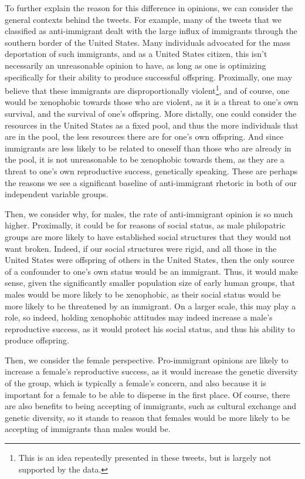 \documentclass{article}
\begin{document}
To further explain the reason for this difference in opinions, we can consider the general contexts behind the tweets. For example, many of the tweets that we classified as anti-immigrant dealt with the large influx of immigrants through the southern border of the United States. Many individuals advocated for the mass deportation of such immigrants, and as a United States citizen, this isn't necessarily an unreasonable opinion to have, as long as one is optimizing specifically for their ability to produce successful offspring. Proximally, one may believe that these immigrants are disproportionally violent\footnote{This is an idea repeatedly presented in these tweets, but is largely not supported by the data.}, and of course, one would be xenophobic towards those who are violent, as it is a threat to one's own survival, and the survival of one's offspring. More distally, one could consider the resources in the United States as a fixed pool, and thus the more individuals that are in the pool, the less resources there are for one's own offspring. And since immigrants are less likely to be related to oneself than those who are already in the pool, it is not unreasonable to be xenophobic towards them, as they are a threat to one's own reproductive success, genetically speaking. These are perhaps the reasons we see a significant baseline of anti-immigrant rhetoric in both of our independent variable groups. 

Then, we consider why, for males, the rate of anti-immigrant opinion is so much higher. Proximally, it could be for reasons of social status, as male philopatric groups are more likely to have established social structures that they would not want broken. Indeed, if our social structures were rigid, and all those in the United States were offspring of others in the United States, then the only source of a confounder to one's own status would be an immigrant. Thus, it would make sense, given the significantly smaller population size of early human groups, that males would be more likely to be xenophobic, as their social status would be more likely to be threatened by an immigrant. On a larger scale, this may play a role, so indeed, holding xenophobic attitudes may indeed increase a male's reproductive success, as it would protect his social status, and thus his ability to produce offspring. 

Then, we consider the female perspective. Pro-immigrant opinions are likely to increase a female's reproductive success\cite{femaleOpinions}, as it would increase the genetic diversity of the group, which is typically a female's concern, and also because it is important for a female to be able to disperse in the first place. Of course, there are also benefits to being accepting of immigrants, such as cultural exchange and genetic diversity, so it stands to reason that females would be more likely to be accepting of immigrants than males would be.
\end{document}
